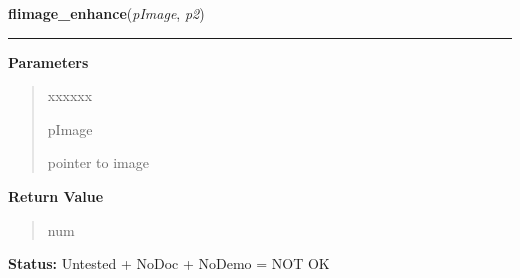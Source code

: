 \hspace{.8\funcindent}\begin{boxedminipage}{\funcwidth}

    \raggedright \textbf{flimage\_enhance}(\textit{pImage}, \textit{p2})

    \vspace{-1.5ex}

    \rule{\textwidth}{0.5\fboxrule}
\setlength{\parskip}{2ex}
\setlength{\parskip}{1ex}
      \textbf{Parameters}
      \vspace{-1ex}

      \begin{quote}
        \begin{Ventry}{xxxxxx}

          \item[pImage]

          pointer to image

        \end{Ventry}

      \end{quote}

      \textbf{Return Value}
    \vspace{-1ex}

      \begin{quote}
      num

      \end{quote}

\textbf{Status:} Untested + NoDoc + NoDemo = NOT OK



    \end{boxedminipage}

    \label{xformslib:flflimage:flimage_from_pixmap}

    \vspace{0.5ex}

